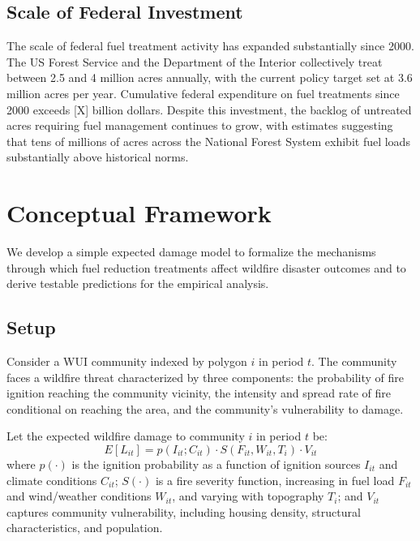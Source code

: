 \documentclass[12pt, letterpaper]{article}
\begin{document}
\subsection{Scale of Federal Investment}

The scale of federal fuel treatment activity has expanded substantially since 2000. The US Forest Service and the Department of the Interior collectively treat between 2.5 and 4 million acres annually, with the current policy target set at 3.6 million acres per year. Cumulative federal expenditure on fuel treatments since 2000 exceeds [X] billion dollars. Despite this investment, the backlog of untreated acres requiring fuel management continues to grow, with estimates suggesting that tens of millions of acres across the National Forest System exhibit fuel loads substantially above historical norms.


\section{Conceptual Framework}

We develop a simple expected damage model to formalize the mechanisms through which fuel reduction treatments affect wildfire disaster outcomes and to derive testable predictions for the empirical analysis.

\subsection{Setup}

Consider a WUI community indexed by polygon $i$ in period $t$. The community faces a wildfire threat characterized by three components: the probability of fire ignition reaching the community vicinity, the intensity and spread rate of fire conditional on reaching the area, and the community's vulnerability to damage.

Let the expected wildfire damage to community $i$ in period $t$ be:
\begin{equation}
    E[L_{it}] = p(I_{it}; C_{it}) \cdot S(F_{it}, W_{it}, T_i) \cdot V_{it}
    \label{eq:expected_damage}
\end{equation}
where $p(\cdot)$ is the ignition probability as a function of ignition sources $I_{it}$ and climate conditions $C_{it}$; $S(\cdot)$ is a fire severity function, increasing in fuel load $F_{it}$ and wind/weather conditions $W_{it}$, and varying with topography $T_i$; and $V_{it}$ captures community vulnerability, including housing density, structural characteristics, and population.
\end{document}
